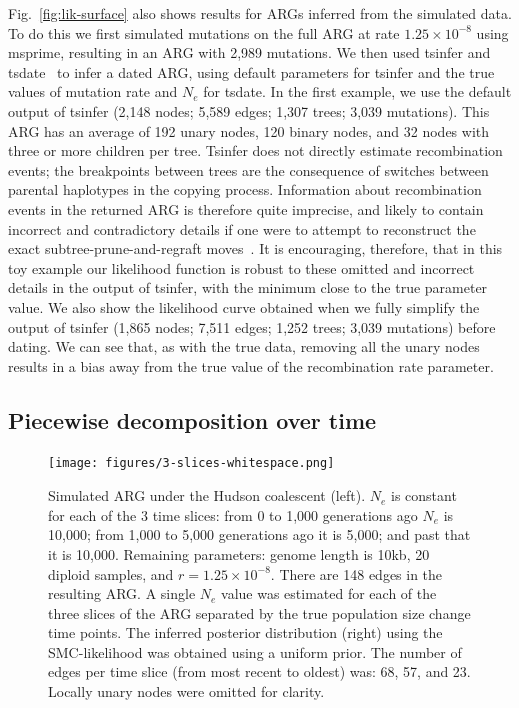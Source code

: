 \documentclass{article}
\begin{document}
Fig.~\ref{fig:lik-surface} also shows results for ARGs inferred from 
the  
simulated data.
To do this we first simulated mutations on the full ARG 
at rate $1.25\times10^{-8}$ using msprime, resulting in an 
ARG with 2,989 mutations.
We then used tsinfer and tsdate~\citep{wohns_unified_2022}
to infer a dated ARG,
using default parameters for tsinfer and the true values of mutation
rate and $N_e$ for tsdate.
In the first example, we use the default output of tsinfer
(2,148 nodes; 5,589 edges; 1,307 trees; 3,039 mutations). 
This ARG has an average of 192 unary nodes, 120 binary nodes, and 32 nodes
with three or more children per tree. Tsinfer does not directly estimate
recombination events; the breakpoints between trees are the consequence of
switches between parental haplotypes in the
\cite{li2003modeling} copying process. Information about
recombination events in the returned ARG is therefore quite imprecise,
and likely to contain incorrect and contradictory details if one were to
attempt to reconstruct the exact subtree-prune-and-regraft
moves~\citep[e.g.,][]{rasmussen2023espalier}. It is encouraging,
therefore, that in this toy example our likelihood function is robust
to these omitted and incorrect details in 
the output of tsinfer, with the minimum close to the true
parameter value. We also show the likelihood curve obtained when we
fully simplify the output of tsinfer
(1,865 nodes; 7,511 edges; 1,252 trees; 3,039 mutations)
before dating. We can see that, as with the true data,
removing all the unary nodes results in a bias 
away from the true value of the recombination rate parameter.

\subsection*{Piecewise decomposition over time}
\begin{figure}
    \centering
    \texttt{[image: figures/3-slices-whitespace.png]}
    \caption{Simulated ARG under the Hudson coalescent (left). $N_e$ is constant
    for each of the 3 time slices:
    from 0 to 1,000 generations ago $N_e$ is 10,000;
    from 1,000 to 5,000 generations ago it is 5,000;
    and past that it is 10,000.
    Remaining parameters: genome length is 10kb, 20 diploid samples, and
    $r=1.25\times10^{-8}$.
    There are 148 edges in the resulting ARG.
    A single $N_e$ value was estimated for each
    of the three slices of the ARG separated by
    the true population size change time points.
    The inferred posterior distribution (right) using the SMC-likelihood was
    obtained using a uniform prior. The number of edges per time slice
    (from most recent to oldest) was: 68, 57, and 23. Locally unary nodes were
    omitted for clarity.}
    \label{fig:3-arg-slices}
\end{figure}
\end{document}
